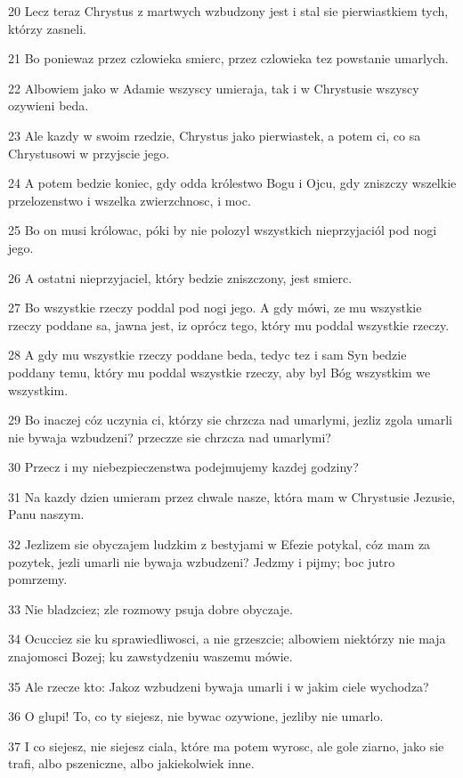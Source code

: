 \par 20 Lecz teraz Chrystus z martwych wzbudzony jest i stal sie pierwiastkiem tych, którzy zasneli.
\par 21 Bo poniewaz przez czlowieka smierc, przez czlowieka tez powstanie umarlych.
\par 22 Albowiem jako w Adamie wszyscy umieraja, tak i w Chrystusie wszyscy ozywieni beda.
\par 23 Ale kazdy w swoim rzedzie, Chrystus jako pierwiastek, a potem ci, co sa Chrystusowi w przyjscie jego.
\par 24 A potem bedzie koniec, gdy odda królestwo Bogu i Ojcu, gdy zniszczy wszelkie przelozenstwo i wszelka zwierzchnosc, i moc.
\par 25 Bo on musi królowac, póki by nie polozyl wszystkich nieprzyjaciól pod nogi jego.
\par 26 A ostatni nieprzyjaciel, który bedzie zniszczony, jest smierc.
\par 27 Bo wszystkie rzeczy poddal pod nogi jego. A gdy mówi, ze mu wszystkie rzeczy poddane sa, jawna jest, iz oprócz tego, który mu poddal wszystkie rzeczy.
\par 28 A gdy mu wszystkie rzeczy poddane beda, tedyc tez i sam Syn bedzie poddany temu, który mu poddal wszystkie rzeczy, aby byl Bóg wszystkim we wszystkim.
\par 29 Bo inaczej cóz uczynia ci, którzy sie chrzcza nad umarlymi, jezliz zgola umarli nie bywaja wzbudzeni? przeczze sie chrzcza nad umarlymi?
\par 30 Przecz i my niebezpieczenstwa podejmujemy kazdej godziny?
\par 31 Na kazdy dzien umieram przez chwale nasze, która mam w Chrystusie Jezusie, Panu naszym.
\par 32 Jezlizem sie obyczajem ludzkim z bestyjami w Efezie potykal, cóz mam za pozytek, jezli umarli nie bywaja wzbudzeni? Jedzmy i pijmy; boc jutro pomrzemy.
\par 33 Nie bladzciez; zle rozmowy psuja dobre obyczaje.
\par 34 Ocucciez sie ku sprawiedliwosci, a nie grzeszcie; albowiem niektórzy nie maja znajomosci Bozej; ku zawstydzeniu waszemu mówie.
\par 35 Ale rzecze kto: Jakoz wzbudzeni bywaja umarli i w jakim ciele wychodza?
\par 36 O glupi! To, co ty siejesz, nie bywac ozywione, jezliby nie umarlo.
\par 37 I co siejesz, nie siejesz ciala, które ma potem wyrosc, ale gole ziarno, jako sie trafi, albo pszeniczne, albo jakiekolwiek inne.
